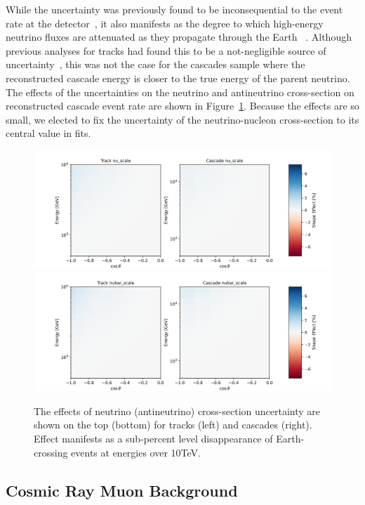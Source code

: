 \documentclass[main.tex]{subfiles}
\begin{document}
While the uncertainty was previously found to be inconsequential to the event rate at the detector~\cite{osti_1221354, 2015PhDT94D}, it also manifests as the degree to which high-energy neutrino fluxes are attenuated as they propagate through the Earth ~\cite{Vincent:2017svp, PhysRevD.83.113009, Cooper_Sarkar_2011}. 
Although previous analyses for tracks had found this to be a not-negligible source of uncertainty~\cite{Aartsen_2020, Aartsen_2020_prd}, this was not the case for the cascades sample where the reconstructed cascade energy is closer to the true energy of the parent neutrino.
The effects of the uncertainties on the neutrino and antineutrino cross-section on reconstructed cascade event rate are shown in Figure~\ref{fig:nucross}.
Because the effects are so small, we elected to fix the uncertainty of the neutrino-nucleon cross-section to its central value in fits. 

\begin{figure}
    \centering
    \includegraphics[width=0.7\linewidth]{figures/systematics/nu_scale.png} \\
    \includegraphics[width=0.7\linewidth]{figures/systematics/nubar_scale.png}
    \caption{The effects of neutrino (antineutrino) cross-section uncertainty are shown on the top (bottom) for tracks (left) and cascades (right). Effect manifests as a sub-percent level disappearance of Earth-crossing events at energies over 10TeV.}\label{fig:nucross}
\end{figure}


\subsection{Cosmic Ray Muon Background}\label{sec:cr_muon}
\end{document}
